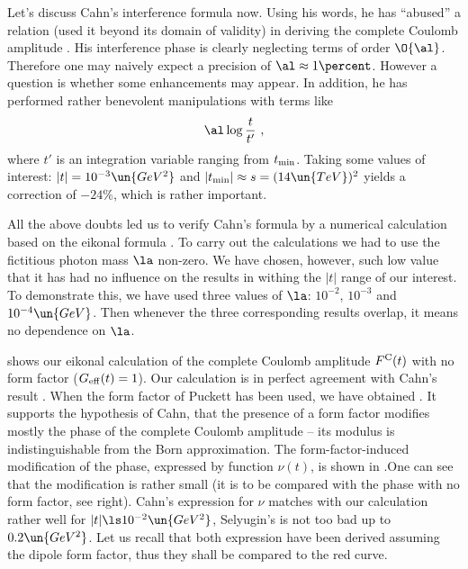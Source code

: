 
Let's discuss Cahn's interference formula  now. Using his words, he has ``abused'' a relation (used it beyond its domain of validity) in deriving the complete Coulomb amplitude . His interference phase is clearly neglecting terms of order $\O{\al}$. Therefore one may naively expect a precision of $\al\approx 1\percent$. However a question is whether some enhancements may appear. In addition, he has performed rather benevolent manipulations with terms like
$$\al \log {t\over t'}\ ,$$
where $t'$ is an integration variable ranging from $t_{\rm min}$. Taking some values of interest: $|t| = 10^{-3}\un{GeV^2}$ and $|t_{\rm min}| \approx s = (14\un{TeV})^2$ yields a correction of $-24\percent$, which is rather important.

All the above doubts led us to verify Cahn's formula by a numerical calculation based on the eikonal formula . To carry out the calculations we had to use the fictitious photon mass $\la$ non-zero. We have chosen, however, such low value that it has had no influence on the results in withing the $|t|$ range of our interest. To demonstrate this, we have used three values of $\la$: $10^{-2}$, $10^{-3}$ and $10^{-4}\un{GeV}$. Then whenever the three corresponding results overlap, it means no dependence on $\la$. 

 shows our eikonal calculation of the complete Coulomb amplitude $F^{\rm C}(t)$ with no form factor ($G_{\rm eff}(t) = 1$). Our calculation is in perfect agreement with Cahn's result . When the form factor of Puckett has been used, we have obtained . It supports the hypothesis of Cahn, that the presence of a form factor modifies mostly the phase of the complete Coulomb amplitude -- its modulus is indistinguishable from the Born approximation. The form-factor-induced modification of the phase, expressed by function $\nu(t)$, is shown in .One can see that the modification is rather small (it is to be compared with the phase with no form factor, see  right). Cahn's expression for $\nu$ matches with our calculation rather well for $|t| \ls 10^{-2}\un{GeV^2}$, Selyugin's is not too bad up to $0.2\un{GeV^2}$. Let us recall that both expression have been derived assuming the dipole form factor, thus they shall be compared to the red curve.


